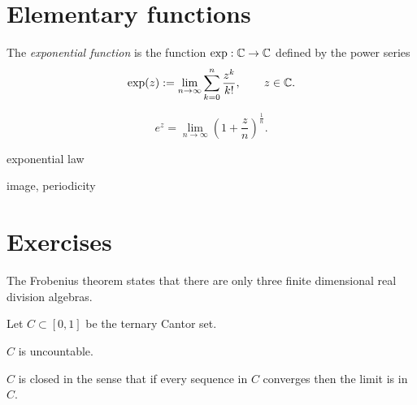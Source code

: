 \documentclass{../../large}
\begin{document}
\section{Elementary functions}



\begin{prb}
The \emph{exponential function} is the function $\exp:\mathbb{C}\to\mathbb{C}$ defined by the power series
\[\exp(z):=\lim_{n\to\infty}\sum_{k=0}^n\frac{z^k}{k!},\qquad z\in\mathbb{C}.\]

\[e^z=\lim_{n\to\infty}\left(1+\frac zn\right)^{\frac1n}.\]
\begin{parts}
\item exponential law
\item image, periodicity
\end{parts}
\end{prb}












\section*{Exercises}
\begin{prb}
\end{prb}

\begin{prb}
\end{prb}

\begin{prb}
\end{prb}

\begin{prb}
The Frobenius theorem states that there are only three finite dimensional real division algebras.
\end{prb}

\begin{prb}
Let $C\subset[0,1]$ be the ternary Cantor set.
\begin{parts}
\item $C$ is uncountable.
\item $C$ is closed in the sense that if every sequence in $C$ converges then the limit is in $C$.
\end{parts}
\end{prb}
\end{document}
